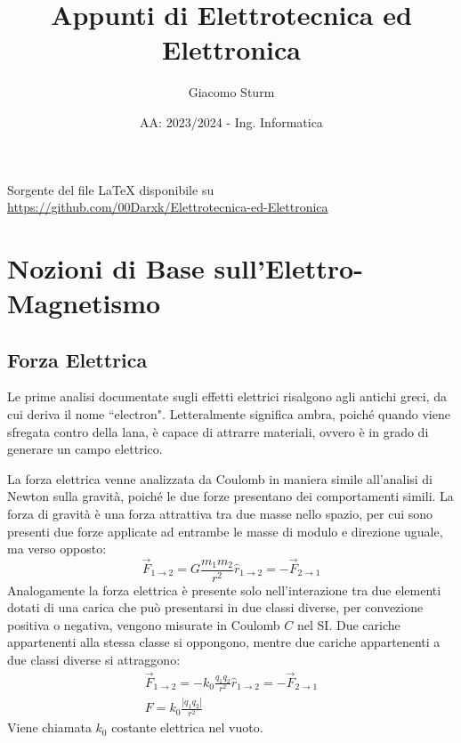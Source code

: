 \documentclass{article}
\numberwithin{equation}{subsection}
\begin{document}
\title{Appunti di Elettrotecnica ed Elettronica}
\author{Giacomo Sturm}
\date{AA: 2023/2024 - Ing. Informatica}



\pagestyle{fancy}
\fancyhead{}\fancyfoot{}
\fancyfoot[C]{\thepage}

\maketitle

\vspace{10mm}

\begin{center}
    Sorgente del file LaTeX disponibile su \url{https://github.com/00Darxk/Elettrotecnica-ed-Elettronica}
\end{center}

\clearpage

\tableofcontents

\clearpage


\section{Nozioni di Base sull'Elettro-Magnetismo}

\subsection{Forza Elettrica}
Le prime analisi documentate sugli effetti elettrici risalgono agli antichi greci, da cui deriva il nome ``electron". %
Letteralmente significa ambra, poiché 
quando viene sfregata contro della lana, è capace di attrarre materiali, ovvero è in grado di generare un campo elettrico.

La forza elettrica venne analizzata da Coulomb in maniera simile all'analisi di Newton sulla gravità, poiché le due forze presentano dei comportamenti simili. La forza di 
gravità è una forza attrattiva tra due masse nello spazio, per cui sono presenti due forze applicate ad entrambe le masse di modulo e direzione uguale, ma verso opposto: 
\begin{equation*}
    \vec{F}_{1\to2}=G\displaystyle\frac{m_1m_2}{r^2}\hat{r}_{1\to2}=-\vec{F}_{2\to1}
\end{equation*}
Analogamente la forza elettrica è presente solo nell'interazione tra due elementi dotati di una carica che può presentarsi in due classi diverse, per convezione 
positiva o negativa, vengono misurate in Coulomb $C$ nel SI. Due cariche appartenenti alla stessa classe si oppongono, mentre due cariche appartenenti a due classi diverse 
si attraggono:
\begin{gather}
    \vec{F}_{1\to2}=-k_0\displaystyle\frac{q_1q_2}{r^2}\hat{r}_{1\to2}=-\vec{F}_{2\to1}\\
    F=k_0\displaystyle\frac{|q_1q_2|}{r^2}
\end{gather} 
Viene chiamata $k_0$ costante elettrica nel vuoto. 
\end{document}
